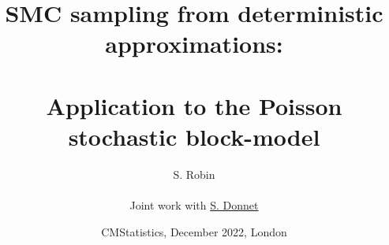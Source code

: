 \documentclass[8pt]{beamer}
\begin{document}

\title[SMC sampling for Poisson SBM]{SMC sampling from deterministic approximations: \\ ~\\ Application to the Poisson stochastic block-model}

\author[S. Robin]{S. Robin \\ ~\\
    Joint work with \underline{S. Donnet}
  }


\date[Dec.'22, London]{CMStatistics, December 2022, London}

\maketitle

\end{document}
